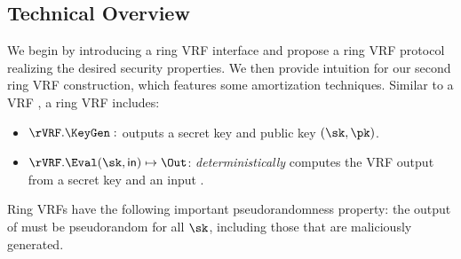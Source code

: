 
\subsection{Technical Overview}
\label{sec:overview}


We begin by introducing a ring VRF interface and propose a ring VRF protocol realizing the desired security properties.
We then provide intuition for our second ring VRF construction, which features some amortization techniques.
Similar to a VRF \cite{vrf_micali}, a ring VRF includes:

\begin{itemize}
\item $\rVRF.\KeyGen: $ outputs a secret key and public key $ (\sk, \pk)$.

\item $\rVRF.\Eval(\sk,\msg) \mapsto \Out$:  \emph{deterministically} computes the VRF output \Out from a secret key \sk and an input \msg.
\end{itemize}
%


Ring VRFs have the following important pseudorandomness property: the output of \Eval must be pseudorandom for all $ \sk $, including those that are maliciously generated.


